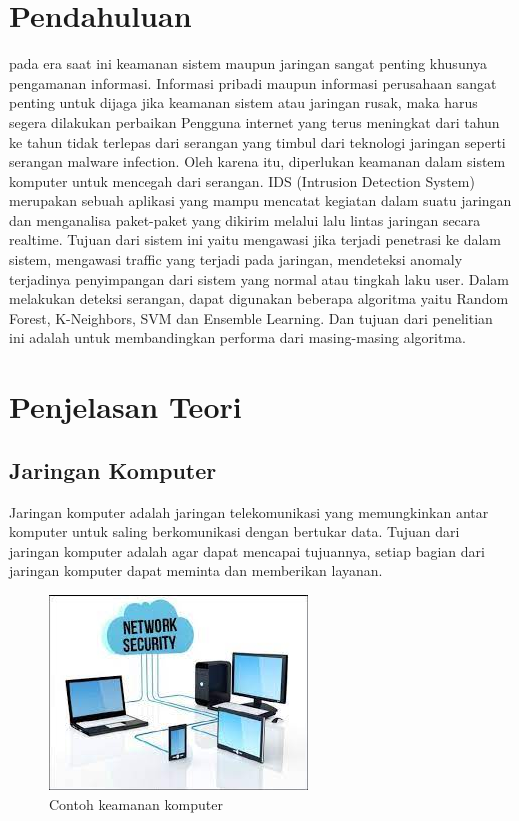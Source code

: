 \documentclass[conference]{IEEEtran}
\begin{document}
\section{Pendahuluan}
pada era saat ini keamanan sistem maupun jaringan sangat
penting khusunya pengamanan informasi. Informasi pribadi
maupun informasi perusahaan sangat penting untuk dijaga
jika keamanan sistem atau jaringan rusak, maka harus segera
dilakukan perbaikan
Pengguna internet yang terus meningkat dari tahun ke
tahun tidak terlepas dari serangan yang timbul dari teknologi
jaringan seperti serangan malware infection. Oleh karena itu,
diperlukan keamanan dalam sistem komputer untuk mencegah
dari serangan.
IDS (Intrusion Detection System) merupakan sebuah aplikasi yang mampu mencatat kegiatan dalam suatu jaringan
dan menganalisa paket-paket yang dikirim melalui lalu lintas
jaringan secara realtime. Tujuan dari sistem ini yaitu mengawasi jika terjadi penetrasi ke dalam sistem, mengawasi traffic yang terjadi pada jaringan, mendeteksi anomaly terjadinya
penyimpangan dari sistem yang normal atau tingkah laku user.
Dalam melakukan deteksi serangan, dapat digunakan beberapa algoritma yaitu Random Forest, K-Neighbors, SVM dan
Ensemble Learning. Dan tujuan dari penelitian ini adalah untuk membandingkan performa dari masing-masing algoritma.

\section{Penjelasan Teori}

\subsection{Jaringan Komputer}

Jaringan komputer adalah jaringan telekomunikasi yang memungkinkan antar komputer untuk saling berkomunikasi dengan bertukar data. Tujuan dari jaringan komputer adalah agar dapat mencapai tujuannya, setiap bagian dari jaringan komputer dapat meminta dan memberikan layanan.

\begin{figure}
\centering
\includegraphics[width=.4\textwidth]{Gambar/gambar7.jpg}
\caption{Contoh keamanan komputer}
\end{figure}
\end{document}
